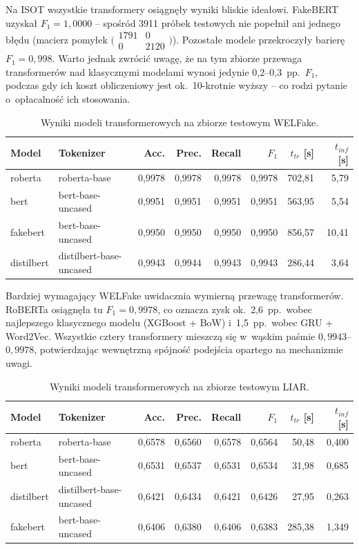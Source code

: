 \documentclass[oneside,polski,logo]{amuthesis}
\begin{document}
Na ISOT wszystkie transformery osiągnęły wyniki bliskie ideałowi.
FakeBERT uzyskał \(F_1 = 1{,}0000\) -- spośród 3911 próbek testowych
nie popełnił ani jednego błędu (macierz pomyłek
$\bigl(\begin{smallmatrix}1791 & 0\\ 0 & 2120\end{smallmatrix}\bigr)$).
Pozostałe modele przekroczyły barierę \(F_1 = 0{,}998\). Warto jednak
zwrócić uwagę, że na tym zbiorze przewaga transformerów nad klasycznymi
modelami wynosi jedynie 0{,}2--0{,}3~pp.\ \(F_1\), podczas gdy ich koszt
obliczeniowy jest ok.\ 10-krotnie wyższy -- co rodzi pytanie o~opłacalność
ich stosowania.

\begin{table}[ht]
\centering
\caption{Wyniki modeli transformerowych na zbiorze testowym WELFake.}
\label{tab:bert_welfake}
\begin{tabular}{llrrrrrr}
\toprule
Model & Tokenizer & Acc. & Prec. & Recall & $F_1$ & $t_{tr}$ [s] & $t_{inf}$ [s] \\
\midrule
roberta    & roberta-base            & 0,9978 & 0,9978 & 0,9978 & 0,9978 & 702,81 & 5,79  \\
bert       & bert-base-uncased       & 0,9951 & 0,9951 & 0,9951 & 0,9951 & 563,95 & 5,54  \\
fakebert   & bert-base-uncased       & 0,9950 & 0,9950 & 0,9950 & 0,9950 & 856,57 & 10,41 \\
distilbert & distilbert-base-uncased & 0,9943 & 0,9944 & 0,9943 & 0,9943 & 286,44 & 3,64  \\
\bottomrule
\end{tabular}
\end{table}

Bardziej wymagający WELFake uwidacznia wymierną przewagę transformerów.
RoBERTa osiągnęła tu \(F_1 = 0{,}9978\), co oznacza zysk ok.\ 2{,}6~pp.\
wobec najlepszego klasycznego modelu (XGBoost + BoW) i~1{,}5~pp.\ wobec
GRU + Word2Vec. Wszystkie cztery transformery mieszczą się w~wąskim
paśmie \(0{,}9943\)--\(0{,}9978\), potwierdzając wewnętrzną spójność
podejścia opartego na mechanizmie uwagi.

\begin{table}[ht]
\centering
\caption{Wyniki modeli transformerowych na zbiorze testowym LIAR.}
\label{tab:bert_liar}
\begin{tabular}{llrrrrrr}
\toprule
Model & Tokenizer & Acc. & Prec. & Recall & $F_1$ & $t_{tr}$ [s] & $t_{inf}$ [s] \\
\midrule
roberta    & roberta-base            & 0,6578 & 0,6560 & 0,6578 & 0,6564 & 50,48  & 0,400 \\
bert       & bert-base-uncased       & 0,6531 & 0,6537 & 0,6531 & 0,6534 & 31,98  & 0,685 \\
distilbert & distilbert-base-uncased & 0,6421 & 0,6434 & 0,6421 & 0,6426 & 27,95  & 0,263 \\
fakebert   & bert-base-uncased       & 0,6406 & 0,6380 & 0,6406 & 0,6383 & 285,38 & 1,349 \\
\bottomrule
\end{tabular}
\end{table}
\end{document}
